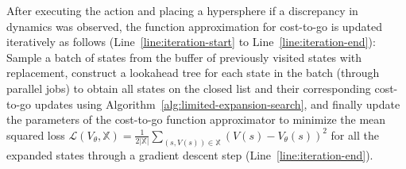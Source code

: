 After executing the action and placing a hypersphere if a discrepancy
in dynamics
was observed, the function approximation for cost-to-go is updated
iteratively as follows (Line~\ref{line:iteration-start} to
Line~\ref{line:iteration-end}): Sample a batch of states from the buffer
of previously visited states with replacement, construct a lookahead
tree for each state in the batch (through parallel jobs) to obtain all
states on the closed list and their corresponding cost-to-go updates
using Algorithm~\ref{alg:limited-expansion-search},
and finally update the parameters of the cost-to-go function
approximator to minimize the mean squared loss $\mathcal{L}(V_\theta, \mathbb{X}) = \frac{1}{2|\mathbb{X}|} \sum_{(s,
    V(s)) \in \mathbb{X}} (V(s) - V_\theta(s))^2$ for all the expanded
states through a gradient descent step (Line~\ref{line:iteration-end}).

